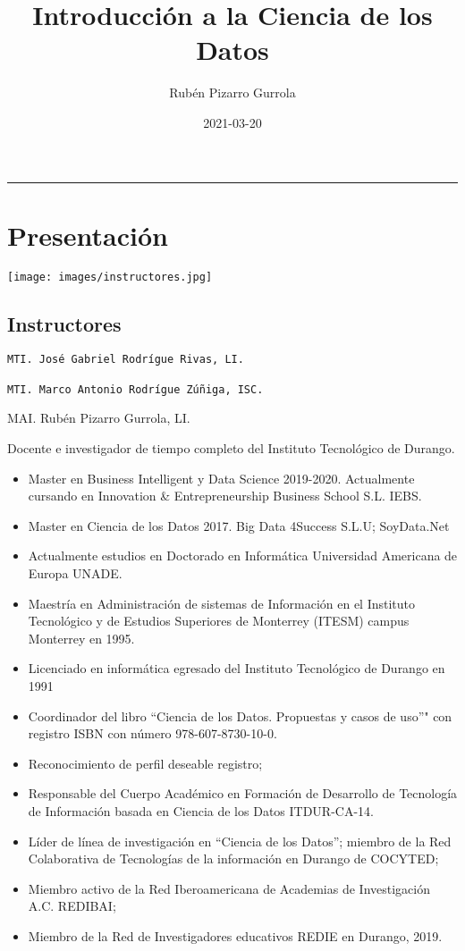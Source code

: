 \documentclass[
]{book}
\title{Introducción a la Ciencia de los Datos}
\author{Rubén Pizarro Gurrola}
\date{2021-03-20}
\begin{document}
\maketitle

{
\setcounter{tocdepth}{1}
\tableofcontents
}
\begin{center}\rule{0.5\linewidth}{0.5pt}\end{center}

\hypertarget{presentaciuxf3n}{%
\chapter{Presentación}\label{presentaciuxf3n}}

\texttt{[image: images/instructores.jpg]}

\hypertarget{instructores}{%
\section{Instructores}\label{instructores}}

\begin{verbatim}
MTI. José Gabriel Rodrígue Rivas, LI.

MTI. Marco Antonio Rodrígue Zúñiga, ISC.
\end{verbatim}

MAI. Rubén Pizarro Gurrola, LI.

Docente e investigador de tiempo completo del Instituto Tecnológico de Durango.

\begin{itemize}
\item
  Master en Business Intelligent y Data Science 2019-2020. Actualmente cursando en Innovation \& Entrepreneurship Business School S.L. IEBS.
\item
  Master en Ciencia de los Datos 2017. Big Data 4Success S.L.U; SoyData.Net
\item
  Actualmente estudios en Doctorado en Informática Universidad Americana de Europa UNADE.
\item
  Maestría en Administración de sistemas de Información en el Instituto Tecnológico y de Estudios Superiores de Monterrey (ITESM) campus Monterrey en 1995.
\item
  Licenciado en informática egresado del Instituto Tecnológico de Durango en 1991
\item
  Coordinador del libro ``Ciencia de los Datos. Propuestas y casos de uso''" con registro ISBN con número 978-607-8730-10-0.
\item
  Reconocimiento de perfil deseable registro;
\item
  Responsable del Cuerpo Académico en Formación de Desarrollo de Tecnología de Información basada en Ciencia de los Datos ITDUR-CA-14.
\item
  Líder de línea de investigación en ``Ciencia de los Datos''; miembro de la Red Colaborativa de Tecnologías de la información en Durango de COCYTED;
\item
  Miembro activo de la Red Iberoamericana de Academias de Investigación A.C. REDIBAI;
\item
  Miembro de la Red de Investigadores educativos REDIE en Durango, 2019.
\end{itemize}
\end{document}

